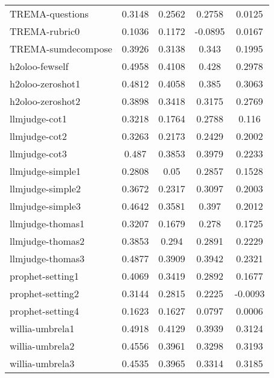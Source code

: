 \begin{table}[ht]
{\begin{tabular}{lcccc}
    TREMA-questions & 0.3148 & 0.2562 & 0.2758 & 0.0125 \\
    TREMA-rubric0 & 0.1036 & 0.1172 & -0.0895 & 0.0167 \\
    TREMA-sumdecompose & 0.3926 & 0.3138 & 0.343 & 0.1995 \\
    h2oloo-fewself & 0.4958 & 0.4108 & 0.428 & 0.2978 \\
    h2oloo-zeroshot1 & 0.4812 & 0.4058 & 0.385 & 0.3063 \\
    h2oloo-zeroshot2 & 0.3898 & 0.3418 & 0.3175 & 0.2769 \\
    llmjudge-cot1 & 0.3218 & 0.1764 & 0.2788 & 0.116 \\
    llmjudge-cot2 & 0.3263 & 0.2173 & 0.2429 & 0.2002 \\
    llmjudge-cot3 & 0.487 & 0.3853 & 0.3979 & 0.2233 \\
    llmjudge-simple1 & 0.2808 & 0.05 & 0.2857 & 0.1528 \\
    llmjudge-simple2 & 0.3672 & 0.2317 & 0.3097 & 0.2003 \\
    llmjudge-simple3 & 0.4642 & 0.3581 & 0.397 & 0.2012 \\
    llmjudge-thomas1 & 0.3207 & 0.1679 & 0.278 & 0.1725 \\
    llmjudge-thomas2 & 0.3853 & 0.294 & 0.2891 & 0.2229 \\
    llmjudge-thomas3 & 0.4877 & 0.3909 & 0.3942 & 0.2321 \\
    prophet-setting1 & 0.4069 & 0.3419 & 0.2892 & 0.1677 \\
    prophet-setting2 & 0.3144 & 0.2815 & 0.2225 & -0.0093 \\
    prophet-setting4 & 0.1623 & 0.1627 & 0.0797 & 0.0006 \\
    willia-umbrela1 & 0.4918 & 0.4129 & 0.3939 & 0.3124 \\
    willia-umbrela2 & 0.4556 & 0.3961 & 0.3298 & 0.3193 \\
    willia-umbrela3 & 0.4535 & 0.3965 & 0.3314 & 0.3185 \\
    \bottomrule
    \end{tabular}
    }
    \label{tab:alpha}
\end{table}